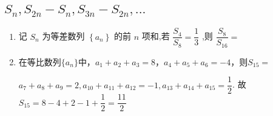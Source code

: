 \subsection*{$S_n, S_{2n}-S_n, S_{3n}-S_{2n}, ...$}
\begin{enumerate}
    \item 记 ${S}_{n}$ 为等差数列 $\left\{  {a}_{n}\right\}$ 的前 $n$ 项和,若 $\dfrac{{S}_{4}}{{S}_{8}} = \dfrac{1}{3}$ ,则 $\dfrac{{S}_{8}}{{S}_{16}} =$
    \item 在等比数列$\{a_n\}$中，$a_1 + a_2 + a_3 = 8$，$a_4 + a_5 + a_6 = -4$，则$S_{15} = $
    \begin{jieda}
        $a_7 + a_8 + a_9 = 2, a_{10} + a_{11} + a_{12} = -1, a_{13} + a_{14} + a_{15} = \dfrac{1}{2}$. 故$S_{15} = 8 - 4 + 2 - 1 + \dfrac{1}{2} = \dfrac{11}{2}$
    \end{jieda}
\end{enumerate}
